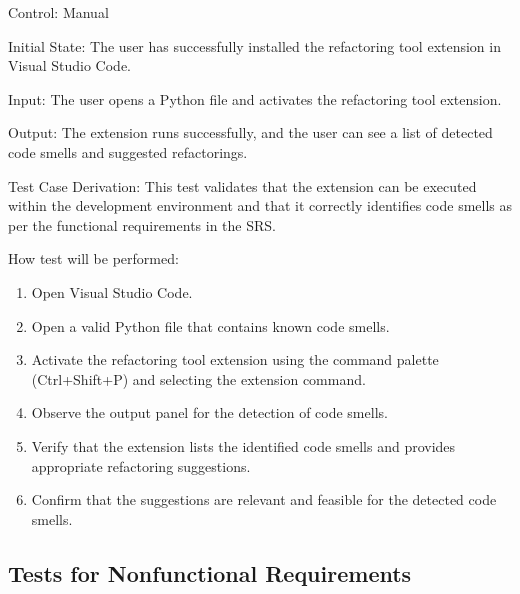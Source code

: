 \documentclass[12pt, titlepage]{article}
\begin{document}
\begin{enumerate}
Control: Manual

Initial State: The user has successfully installed the refactoring tool extension in Visual Studio Code.

Input: The user opens a Python file and activates the refactoring tool extension.

Output: The extension runs successfully, and the user can see a list of detected code smells and suggested refactorings.

Test Case Derivation: This test validates that the extension can be executed within the development environment and that it correctly identifies code smells as per the functional requirements in the SRS.

How test will be performed:
\begin{enumerate}
    \item Open Visual Studio Code.
    \item Open a valid Python file that contains known code smells.
    \item Activate the refactoring tool extension using the command palette (Ctrl+Shift+P) and selecting the extension command.
    \item Observe the output panel for the detection of code smells.
    \item Verify that the extension lists the identified code smells and provides appropriate refactoring suggestions.
    \item Confirm that the suggestions are relevant and feasible for the detected code smells.
\end{enumerate}

\end{enumerate}

\subsection{Tests for Nonfunctional Requirements}


\end{document}
